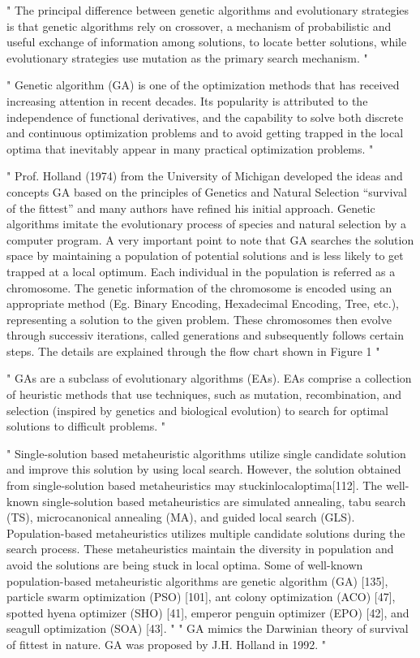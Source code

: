 "
The principal difference between genetic algorithms and evolutionary strategies is that genetic algorithms rely on crossover, a mechanism of probabilistic and useful exchange of information among solutions, to locate better solutions, while evolutionary strategies use mutation as the primary search mechanism.
"\cite{srinivas_genetic_1994}


"
Genetic algorithm (GA) is one of the optimization methods that has received increasing attention in recent decades. Its popularity is attributed to the independence of functional derivatives, and the capability to solve both discrete and continuous optimization problems and to avoid getting trapped in the local optima that inevitably appear in many practical optimization problems.
"\cite{xia_genetic_2019}


"
Prof. Holland (1974) from the University of Michigan developed the ideas and concepts GA based on the principles of Genetics and Natural Selection “survival of the fittest” and many authors have refined his initial approach. Genetic algorithms imitate the evolutionary process of species and natural selection by a computer program. A very important point to note that GA searches the solution space by maintaining a population of potential solutions and is less likely to get trapped at a local optimum. Each individual in the population is referred as a chromosome. The genetic information of the chromosome is encoded using an appropriate method (Eg. Binary Encoding, Hexadecimal Encoding, Tree, etc.), representing a solution to the given problem. These chromosomes then evolve through successiv iterations, called generations and subsequently follows certain steps. The details are explained through the flow chart shown in Figure 1
"\cite{majumdar_genetic_2015}


"
GAs are a subclass of evolutionary algorithms (EAs). EAs comprise a collection of heuristic methods that use techniques, such as mutation, recombination, and selection (inspired by genetics and biological evolution) to search for optimal solutions to difficult problems.
"\cite{mills_determining_2015}

"
Single-solution based metaheuristic algorithms utilize single candidate solution and improve this solution by using local search. However, the solution obtained from single-solution based metaheuristics may stuckinlocaloptima[112]. The well-known single-solution based metaheuristics are
simulated annealing, tabu search (TS), microcanonical annealing (MA), and guided local search (GLS). Population-based metaheuristics utilizes multiple candidate solutions during the search process. These metaheuristics maintain the diversity in population and avoid the solutions are being stuck in local optima. Some of well-known population-based metaheuristic algorithms are genetic algorithm (GA) [135], particle swarm optimization (PSO) [101], ant colony optimization (ACO) [47], spotted hyena optimizer (SHO) [41], emperor penguin optimizer (EPO) [42], and seagull optimization (SOA) [43].
"\cite{katoch_review_2021}
"
GA mimics the Darwinian theory of survival of fittest in nature. GA was proposed by J.H. Holland in 1992.
"\cite{katoch_review_2021}

